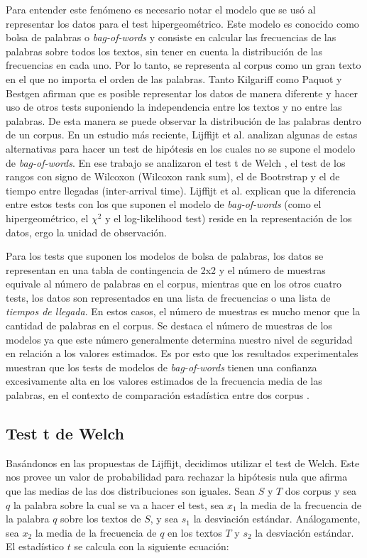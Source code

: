 Para entender este fenómeno es necesario notar el modelo que se usó al representar los datos para el test hipergeométrico. Este modelo es conocido como bolsa de palabras o \textit{bag-of-words} y consiste en calcular las frecuencias de las palabras sobre todos los textos, sin tener en cuenta la distribución de las frecuencias en cada uno. Por lo tanto, se representa al corpus como un gran texto en el que no importa el orden de las palabras. Tanto Kilgariff \cite{kilgarriff2001comparing} como Paquot y Bestgen \cite{paquot2009distinctive} afirman que es posible representar los datos de manera diferente y hacer uso de otros tests suponiendo la independencia entre los textos y no entre las palabras. De esta manera se puede observar la distribución de las palabras dentro de un corpus. En un estudio más reciente, Lijffijt et al. \cite{doi:10.1093/llc/fqu064} analizan algunas de estas alternativas para hacer un test de hipótesis en los cuales no se supone el modelo de \textit{bag-of-words}. En ese trabajo se analizaron el test t de Welch \cite{welch1947generalization}, el test de los rangos con signo de Wilcoxon (Wilcoxon rank sum), el de Bootrstrap y el de tiempo entre llegadas (inter-arrival time). Lijffijt et al. explican que la diferencia entre estos tests con los que suponen el modelo de \textit{bag-of-words} (como el hipergeométrico, el ${\chi}^2$ y el log-likelihood test) reside en la representación de los datos, ergo la unidad de observación.

Para los tests que suponen los modelos de bolsa de palabras, los datos se representan en una tabla de contingencia de 2x2 y el número de muestras equivale al número de palabras en el corpus, mientras que en los otros cuatro tests, los datos son representados en una lista de frecuencias o una lista de \textit{tiempos de llegada}. En estos casos, el número de muestras es mucho menor que la cantidad de palabras en el corpus. Se destaca el número de muestras de los modelos ya que este número generalmente determina nuestro nivel de seguridad en relación a los valores estimados. Es por esto que los resultados experimentales muestran que los tests de modelos de \textit{bag-of-words} tienen una confianza excesivamente alta en los valores estimados de la frecuencia media de las palabras, en el contexto de comparación estadística entre dos corpus \cite{doi:10.1093/llc/fqu064}.

\subsection{Test t de Welch}
Basándonos en las propuestas de Lijffijt, decidimos utilizar el test de Welch. Este nos provee un valor de probabilidad para rechazar la hipótesis nula que afirma que las medias de las dos distribuciones son iguales. Sean $S$ y $T$ dos corpus y sea $q$ la palabra sobre la cual se va a hacer el test, sea $x_1$ la media de la frecuencia de la palabra $q$ sobre los textos de $S$, y sea $s_1$ la desviación estándar. Análogamente, sea $x_2$ la media de la frecuencia de $q$ en los textos $T$ y $s_2$ la desviación estándar. El estadístico $t$ se calcula con la siguiente ecuación: 

